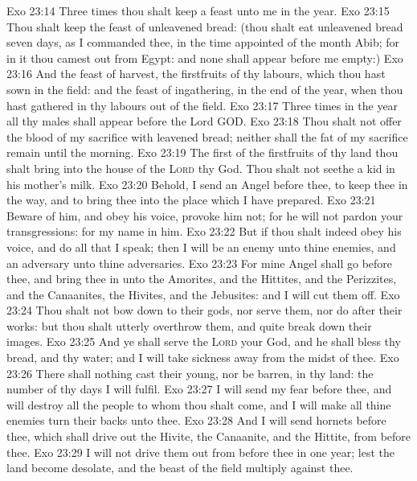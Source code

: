 \vs Exo 23:14 Three times thou shalt keep a feast unto me in the year.
\vs Exo 23:15 Thou shalt keep the feast of unleavened bread: (thou shalt eat unleavened bread seven days, as I commanded thee, in the time appointed of the month Abib; for in it thou camest out from Egypt: and none shall appear before me empty:)
\vs Exo 23:16 And the feast of harvest, the firstfruits of thy labours, which thou hast sown in the field: and the feast of ingathering,  in the end of the year, when thou hast gathered in thy labours out of the field.
\vs Exo 23:17 Three times in the year all thy males shall appear before the Lord GOD.
\vs Exo 23:18 Thou shalt not offer the blood of my sacrifice with leavened bread; neither shall the fat of my sacrifice remain until the morning.
\vs Exo 23:19 The first of the firstfruits of thy land thou shalt bring into the house of the \textsc{Lord} thy God. Thou shalt not seethe a kid in his mother's milk.
\vs Exo 23:20 Behold, I send an Angel before thee, to keep thee in the way, and to bring thee into the place which I have prepared.
\vs Exo 23:21 Beware of him, and obey his voice, provoke him not; for he will not pardon your transgressions: for my name  in him.
\vs Exo 23:22 But if thou shalt indeed obey his voice, and do all that I speak; then I will be an enemy unto thine enemies, and an adversary unto thine adversaries.
\vs Exo 23:23 For mine Angel shall go before thee, and bring thee in unto the Amorites, and the Hittites, and the Perizzites, and the Canaanites, the Hivites, and the Jebusites: and I will cut them off.
\vs Exo 23:24 Thou shalt not bow down to their gods, nor serve them, nor do after their works: but thou shalt utterly overthrow them, and quite break down their images.
\vs Exo 23:25 And ye shall serve the \textsc{Lord} your God, and he shall bless thy bread, and thy water; and I will take sickness away from the midst of thee.
\vs Exo 23:26 There shall nothing cast their young, nor be barren, in thy land: the number of thy days I will fulfil.
\vs Exo 23:27 I will send my fear before thee, and will destroy all the people to whom thou shalt come, and I will make all thine enemies turn their backs unto thee.
\vs Exo 23:28 And I will send hornets before thee, which shall drive out the Hivite, the Canaanite, and the Hittite, from before thee.
\vs Exo 23:29 I will not drive them out from before thee in one year; lest the land become desolate, and the beast of the field multiply against thee.
